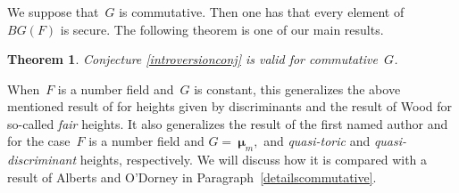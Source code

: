 \documentclass[a4paper,english,12pt]{amsart}
\newcommand{\muu}{\boldsymbol{\mu}}
\newtheorem{thm}[equation]{Theorem}
\numberwithin{equation}{subsection}
\begin{document}
\subsubsection{} We suppose that~$G$ is commutative. Then one has that every element of~$BG(F)$ is secure. The following theorem is one of our main results.
\begin{thm}\label{comcasmalle}
Conjecture \ref{introversionconj} is valid for commutative~$G$.
\end{thm}
When~$F$ is a number field and~$G$ is constant, this generalizes the above mentioned result of \cite{Wright} for heights given by discriminants and the result of Wood \cite[Theorem 3.1.]{onprobabilitieslocal} for so-called {\it fair} heights. It also generalizes the result of the first named author \cite[Theorem 8.2.2.12]{darda:tel-03682761} and \cite[Corollary 9.2.5.10]{darda:tel-03682761} for the case~$F$ is a number field and $G=~\muu_m,$ and {\it quasi-toric} and {\it quasi-discriminant} heights, respectively. We will discuss how it is compared with a result of Alberts and O'Dorney \cite{odorney} in Paragraph~\ref{detailscommutative}. 
\end{document}
